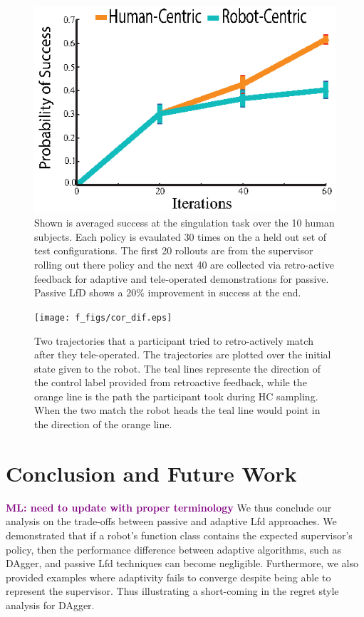 \documentclass[10pt, conference]{ieeeconf}      %
\newcommand{\mlnote}[1]{\ifthenelse{ \boolean{include-notes}}%
 {\textcolor{purple}{\textbf{ML: #1}}}{}}
\begin{document}
\begin{figure}
\centering
\includegraphics{f_figs/izzy_reward.eps}
\caption{
    \footnotesize
Shown is averaged success at the singulation task over the 10 human subjects. Each policy is evaulated 30 times on the a held out set of test configurations. The first 20 rollouts are from the supervisor rolling out there policy and the next 40 are collected via retro-active feedback for adaptive and tele-operated demonstrations for passive. Passive LfD shows a 20$\%$ improvement in success at the end. }

\label{fig:izzy_rw}
\end{figure}


\begin{figure}
\centering
\texttt{[image: f\_figs/cor\_dif.eps]}
\caption{
    \footnotesize
Two trajectories that a participant tried to retro-actively match after they  tele-operated. The trajectories are plotted over the initial state given to the robot. The teal lines represente the direction of the control label provided from retroactive feedback, while the orange line is the path the participant took during HC sampling. When the two match the robot heads the teal line would point in the direction of the orange line.  }
\vspace*{-20pt}
\label{fig:izzy_rw}
\end{figure}

\section{Conclusion and Future Work}
\mlnote{need to update with proper terminology}
We thus conclude our analysis on the trade-offs between passive and adaptive Lfd approaches. We demonstrated that if a robot's function class contains the expected supervisor's policy, then the  performance difference between adaptive algorithms, such as DAgger,  and passive Lfd techniques can become negligible.  Furthermore, we also provided examples where adaptivity fails to converge despite being able to represent the supervisor. Thus illustrating a short-coming in the regret style analysis for DAgger. 
\end{document}
